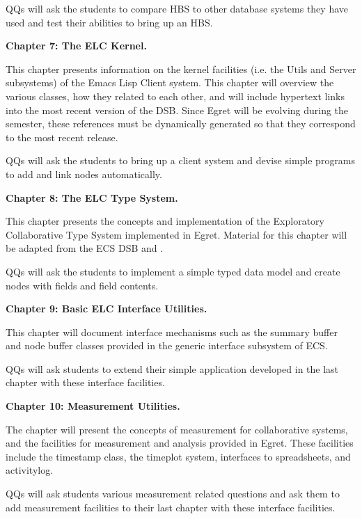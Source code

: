\begin{itemizenoindent}
QQs will ask the students to compare HBS to other database systems they
have used and test their abilities to bring up an HBS. 

\item {\bf Chapter 7: The ELC Kernel.}

This chapter presents information on the kernel facilities (i.e. the Utils
and Server subsystems) of the Emacs Lisp Client system.  This chapter will
overview the various classes, how they related to each other, and will
include hypertext links into the most recent version of the DSB.  Since
Egret will be evolving during the semester, these references must be
dynamically generated so that they correspond to the most recent release. 

QQs will ask the students to bring up a client system and devise simple 
programs to add and link nodes automatically. 

\item {\bf Chapter 8: The ELC Type System.}

This chapter presents the concepts and implementation of the Exploratory
Collaborative Type System implemented in Egret. Material for this chapter
will be adapted from the ECS DSB and \cite{csdl-93-09}.

QQs will ask the students to implement a simple typed data model and create
nodes with fields and field contents. 

\item {\bf Chapter 9: Basic ELC Interface Utilities.}

This chapter will document interface mechanisms such as the summary
buffer and node buffer classes provided in the generic interface subsystem of ECS.

QQs will ask students to extend their simple application developed in the
last chapter with these interface facilities.

\item {\bf Chapter 10: Measurement Utilities.}
  
  The chapter will present the concepts of measurement for collaborative
  systems, and the facilities for measurement and analysis provided in Egret.
  These facilities include the timestamp class, the timeplot system, 
  interfaces to spreadsheets, and  activitylog.
  
  QQs will ask students various measurement related questions and ask
  them to add measurement facilities to their last chapter with these
  interface facilities.


\end{itemizenoindent}
